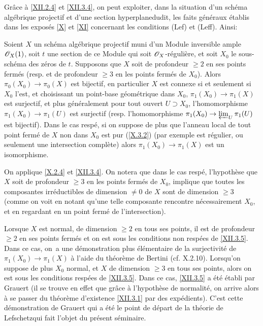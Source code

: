 Gr\^ace \`a \ref{XII.2.4} et \ref{XII.3.4}, on peut exploiter, dans la situation d'un sch\'ema alg\'ebrique projectif et d'une \og section hyperplane\fg dudit, les faits g\'en\'eraux \'etablis dans les expos\'es \ref{X} et \ref{XI} concernant les conditions (Lef) et (Leff). Ainsi:

\begin{corollaire} \label{XII.3.5} Soient $X$ un sch\'ema alg\'ebrique projectif muni d'un Module inversible ample $\mathscr{O}_X(1)$, soit $t$ une section de ce Module qui soit $\mathscr{O}_X$-r\'eguli\`ere, et soit $X_0$ le sous-sch\'ema des z\'eros de $t$. Supposons que $X$ soit de profondeur $\geq 2$ en ses points ferm\'es (resp. et de profondeur $\geq 3$ en les points ferm\'es de $X_0$). Alors $\pi_0(X_0)\to \pi_0(X)$ est bijectif, en particulier $X$ est connexe si et seulement si $X_0$ l'est, et choisissant un point-base g\'eom\'etrique dans $X_0$, $\pi_1(X_0)\to \pi_1(X)$ est surjectif, et plus g\'en\'eralement pour tout ouvert $U\supset X_0$, l'homomorphisme $\pi_1(X_0)\to \pi_1(U)$ est surjectif (resp. l'homomorphisme $\pi_1(X_0)\to \varprojlim_U\pi_1(U)$ est bijectif). Dans le cas resp\'e, si on suppose de plus que l'anneau local de tout point ferm\'e de $X$ non dans $X_0$ est pur (\ref{X.3.2}) (par exemple est r\'egulier, ou seulement une intersection compl\`ete) alors $\pi_1(X_0)\to \pi_1(X)$ est un isomorphisme.
\end{corollaire}

On applique \ref{X.2.4} et \ref{XII.3.4}. On notera que dans le cas resp\'e, l'hypoth\`ese que $X$ soit de profondeur $\geq 3$ en les points ferm\'es de $X_0$, implique que toutes les composantes irr\'eductibles de dimension $\neq 0$ de $X$ sont de dimension $\geq 3$ (comme on voit en notant qu'une telle composante rencontre n\'ecessairement $X_0$, et en regardant en un point ferm\'e de l'intersection).

\begin{remarquestar}
Lorsque $X$ est normal, de dimension $\geq 2$ en tous ses points, il est de profondeur $\geq 2$ en ses points ferm\'es et on est sous les conditions non resp\'ees de \ref{XII.3.5}. Dans ce cas, on~a une d\'emonstration plus \'el\'ementaire de la surjectivit\'e de $\pi_1(X_0)\to \pi_1(X)$ \`a l'aide du th\'eor\`eme de Bertini (cf.  X.2.10). Lorsqu'on suppose de plus $X_0$ normal, et $X$ de dimension $\geq 3$ en tous ses points, alors on est sous les conditions resp\'ees de \ref{XII.3.5}. Dans ce cas, \ref{XII.3.5} a \'et\'e \'etabli par Grauert (il se trouve en effet que gr\^ace \`a l'hypoth\`ese de normalit\'e, on arrive alors \`a se passer du th\'eor\`eme d'existence \ref{XII.3.1} par des exp\'edients). C'est cette d\'emonstration de Grauert qui a \'et\'e le point de d\'epart de la \og th\'eorie de Lefschetz\fg qui fait l'objet du pr\'esent s\'eminaire.
\end{remarquestar}

